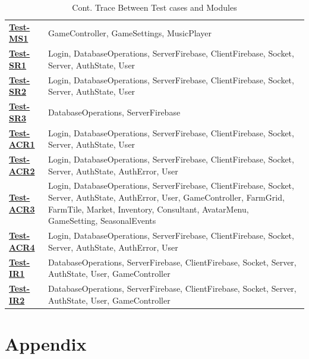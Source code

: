 \documentclass[12pt, titlepage]{article}
\begin{document}
\begin{table}[H]
\centering
\begin{tabular}{p{} p{}}
\toprule
\hyperref[Test-MS1]{\textbf{Test-MS1}} &   GameController, GameSettings, MusicPlayer\\
\hyperref[Test-SR1]{\textbf{Test-SR1}} &  Login, DatabaseOperations, ServerFirebase, ClientFirebase, Socket, Server, AuthState, User\\
\hyperref[Test-SR2]{\textbf{Test-SR2}} &  Login, DatabaseOperations, ServerFirebase, ClientFirebase, Socket, Server, AuthState, User\\
\hyperref[Test-SR3]{\textbf{Test-SR3}} &    DatabaseOperations, ServerFirebase\\
\hyperref[Test-ACR1]{\textbf{Test-ACR1}} &    Login, DatabaseOperations, ServerFirebase, ClientFirebase, Socket, Server, AuthState, User\\
\hyperref[Test-ACR2]{\textbf{Test-ACR2}} &    Login, DatabaseOperations, ServerFirebase, ClientFirebase, Socket, Server, AuthState, AuthError, User\\
\hyperref[Test-ACR3]{\textbf{Test-ACR3}} &    Login, DatabaseOperations, ServerFirebase, ClientFirebase, Socket, Server, AuthState, AuthError, User, GameController, FarmGrid, FarmTile, Market, Inventory, Consultant, AvatarMenu, GameSetting, SeasonalEvents\\
\hyperref[Test-ACR4]{\textbf{Test-ACR4}} &    Login, DatabaseOperations, ServerFirebase, ClientFirebase, Socket, Server, AuthState, AuthError, User\\
\hyperref[Test-IR1]{\textbf{Test-IR1}} &     DatabaseOperations, ServerFirebase, ClientFirebase, Socket, Server, AuthState, User, GameController\\
\hyperref[Test-IR2]{\textbf{Test-IR2}} &     DatabaseOperations, ServerFirebase, ClientFirebase, Socket, Server, AuthState, User, GameController\\
\bottomrule
\end{tabular}
\caption{Cont. Trace Between Test cases and Modules}
\label{TblACT}
\end{table}

				




\newpage

\section{Appendix}
\end{document}
